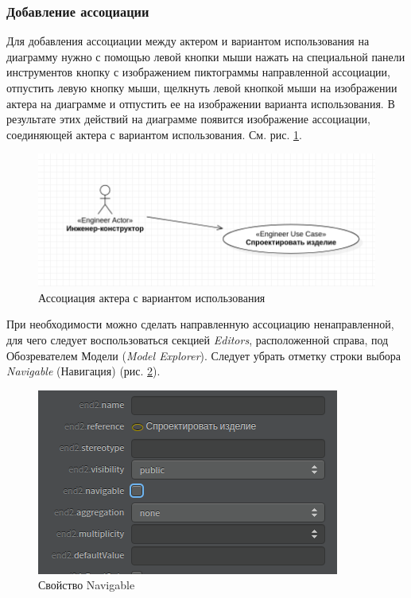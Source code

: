 \documentclass[a4paper,12pt]{extreport}
\begin{document}
\subsubsection*{Добавление ассоциации}
Для добавления ассоциации между актером и вариантом использования на диаграмму нужно с помощью левой кнопки мыши нажать на специальной панели инструментов кнопку с изображением пиктограммы направленной ассоциации, отпустить левую кнопку мыши, щелкнуть левой кнопкой мыши на изображении актера на диаграмме и отпустить ее на изображении варианта использования. В результате этих действий на диаграмме появится изображение ассоциации, соединяющей актера с вариантом использования. См. рис. \ref{fig:actorwithaction}.
\begin{figure}[h!]
	\centering
	\includegraphics[width=0.8\linewidth]{images/actorwithaction}
	\caption{Ассоциация актера с вариантом использования}
	\label{fig:actorwithaction}
\end{figure}
При необходимости можно сделать направленную ассоциацию ненаправленной, для чего следует воспользоваться секцией \textit{Editors}, расположенной справа, под Обозревателем Модели (\textit{Model Explorer}). Следует убрать отметку строки выбора \textit{Navigable} (Навигация) (рис. \ref{fig:navigable}).
\newpage

\begin{figure}[h!]
	\centering
	\includegraphics[width=0.5\linewidth]{images/navigable}
	\caption{Свойство Navigable}
	\label{fig:navigable}
\end{figure}
\end{document}
